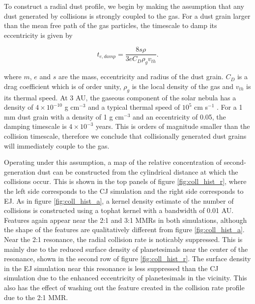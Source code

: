 \documentclass[onecolumn]{aastex63}
\begin{document}
To construct a radial dust profile, we begin by making the assumption that any dust generated by collisions is strongly coupled to the 
gas. For a dust grain larger than the mean free path of the gas particles, the timescale to damp its eccentricity is given by 
\citep{1976PThPh..56.1756A}

\begin{equation}\label{eq:t_edamp}
    t_{e, damp} = \frac{8 s \rho}{3 e C_{D} \rho_{g} v_{th}}.
\end{equation}

where $m$, $e$ and $s$ are the mass, eccentricity and radius of the dust grain. $C_{D}$ is a drag coefficient which is of order unity, $
\rho_{g}$ is the local density of the gas and $v_{th}$ is its thermal speed. At 3 AU, the gaseous component of the solar nebula has a 
density of $4 \times 10^{-10}$ g cm$^{-3}$ and a typical thermal speed of $10^{5}$ cm s$^{-1}$ \citep{1981PThPS..70...35H}. For a 1 
mm dust grain with a density of 1 g cm$^{-3}$ and an eccentricity of 0.05, the damping timescale is $4 \times 10^{-3}$ years. This is 
orders of magnitude smaller than the collision timescale, therefore we conclude that collisionally generated dust grains will immediately 
couple to the gas.

Operating under this assumption, a map of the relative concentration of second-generation dust can be constructed from the cylindrical distance at which the collisions occur. This is shown in the top panels of figure \ref{fig:coll_hist_r}, where the left side corresponds to the CJ simulation and the right side corresponds to EJ. As in figure \ref{fig:coll_hist_a}, a kernel density estimate of the number of collisions is constructed using a tophat kernel with a bandwidth of 0.01 AU. Features again appear near the 2:1 and 3:1 MMRs in both simulations, although the shape of the features are qualitatively different from figure \ref{fig:coll_hist_a}. Near the 2:1 resonance, the radial collision rate is noticably suppressed. This is mainly due to the reduced surface density of planetesimals near the center of the resonance, shown in the second row of figure \ref{fig:coll_hist_r}. The surface density in the EJ simulation near this resonance is less suppressed than the CJ simulation due to the enhanced eccentricity of planetesimals in the vicinity. This also has the effect of washing out the feature created in the collision rate profile due to the 2:1 MMR.
\end{document}
